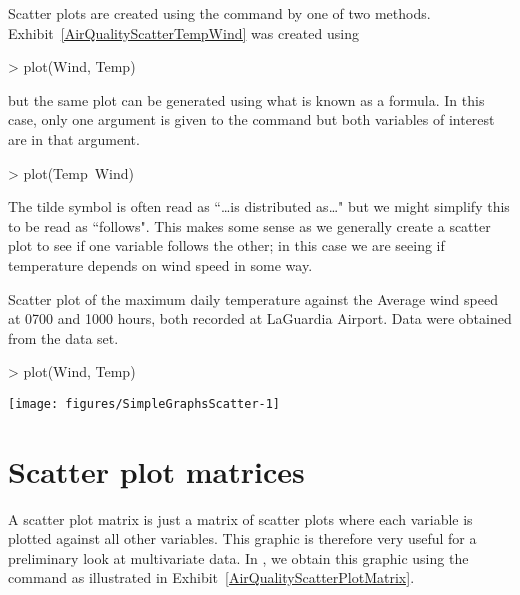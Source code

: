 Scatter plots are created using the  command by one of two methods. Exhibit~\ref{AirQualityScatterTempWind} was created using 
\begin{Schunk}
\begin{Sinput}
> plot(Wind, Temp) 
\end{Sinput}
\end{Schunk}
but the same plot can be generated using what is known as a formula. In this case, only one argument is given to the  command but both variables of interest are in that argument. 
\begin{Schunk}
\begin{Sinput}
> plot(Temp~Wind) 
\end{Sinput}
\end{Schunk}
The tilde symbol is often read as ``\ldots is distributed as\ldots" but we might simplify this to be read as ``follows". This makes some sense as we generally create a scatter plot to see if one variable follows the other; in this case we are seeing if temperature depends on wind speed in some way. 
 
\begin{exhibit} 
\begin{center} 
\caption{Scatter plot of the maximum daily temperature against the Average wind speed at 0700 and 1000 hours, both recorded at LaGuardia Airport. Data were obtained from the  data set.} 
\label{AirQualityScatterTempWind} 
\begin{Schunk}
\begin{Sinput}
> plot(Wind, Temp) 
\end{Sinput}

\texttt{[image: figures/SimpleGraphsScatter-1]} \end{Schunk}
\end{center} 
\end{exhibit} 
 
\section{Scatter plot matrices} 
\label{ScatterPlotMatrices} 
 
A scatter plot matrix is just a matrix of scatter plots where each variable is plotted against all other variables. This graphic is therefore very useful for a preliminary look at multivariate data. In \R{}, we obtain this graphic using the  command as illustrated in Exhibit~\ref{AirQualityScatterPlotMatrix}. 
 
